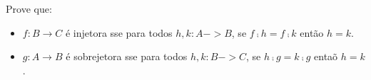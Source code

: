 \begin{exercise}
Prove que:
\begin{itemize}
    \item $f : B \to C$ é injetora sse para todos $h,k : A -> B$, se $f \comp h = f \comp k$ então $h = k$.
    \item $g : A \to B$ é sobrejetora sse para todos $h,k : B -> C$, se $h \comp g = k \comp g$ entaõ $h = k$.
\end{itemize}
\end{exercise}
